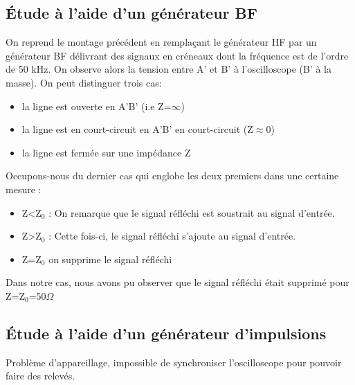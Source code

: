 \documentclass[12pt,a4paper]{article}
\begin{document}
	\subsection{Étude à l'aide d'un générateur BF}
	On reprend le montage précédent en remplaçant le générateur HF par un générateur BF délivrant des signaux en créneaux dont la fréquence est de l'ordre de 50 kHz. On observe alors la tension entre A' et B' à l'oscilloscope (B' à la masse). On peut distinguer trois cas:
	\begin{itemize}%
		\item la ligne est ouverte en A'B' (i.e Z=$\infty$)
		\item la ligne est en court-circuit en A'B' en court-circuit (Z$\approx 0$)
		\item la ligne est fermée sur une impédance Z
	\end{itemize}
	Occupons-nous du dernier cas qui englobe les deux premiers dans une certaine mesure :
	\begin{itemize}
		\item Z<Z$_0$ : On remarque que le signal réfléchi est soustrait au signal d'entrée.
		\item Z>Z$_0$ : Cette fois-ci, le signal réfléchi s'ajoute au signal d'entrée.
		\item  Z=Z$_0$ on supprime le signal réfléchi 
	\end{itemize}
	Dans notre cas, nous avons pu observer que le signal réfléchi était supprimé pour Z=Z$_0$=50$\Omega$
	\subsection{Étude à l'aide d'un générateur d'impulsions}
	Problème d'appareillage, impossible de synchroniser l'oscilloscope pour pouvoir faire des relevés.
\end{document}
